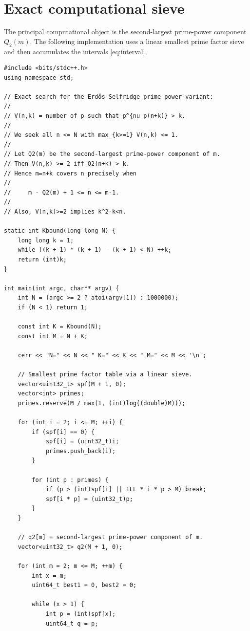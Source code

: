 \documentclass[11pt]{article}
\begin{document}
\appendix

\section{Exact computational sieve}

The principal computational object is the second-largest prime-power
component \(Q_2(m)\).  The following implementation uses a linear smallest
prime factor sieve and then accumulates the intervals \eqref{eq:interval}.

\begin{verbatim}
#include <bits/stdc++.h>
using namespace std;

// Exact search for the Erdős–Selfridge prime-power variant:
//
// V(n,k) = number of p such that p^{nu_p(n+k)} > k.
//
// We seek all n <= N with max_{k>=1} V(n,k) <= 1.
//
// Let Q2(m) be the second-largest prime-power component of m.
// Then V(n,k) >= 2 iff Q2(n+k) > k.
// Hence m=n+k covers n precisely when
//
//     m - Q2(m) + 1 <= n <= m-1.
//
// Also, V(n,k)>=2 implies k^2-k<n.

static int Kbound(long long N) {
    long long k = 1;
    while ((k + 1) * (k + 1) - (k + 1) < N) ++k;
    return (int)k;
}

int main(int argc, char** argv) {
    int N = (argc >= 2 ? atoi(argv[1]) : 1000000);
    if (N < 1) return 1;

    const int K = Kbound(N);
    const int M = N + K;

    cerr << "N=" << N << " K=" << K << " M=" << M << '\n';

    // Smallest prime factor table via a linear sieve.
    vector<uint32_t> spf(M + 1, 0);
    vector<int> primes;
    primes.reserve(M / max(1, (int)log((double)M)));

    for (int i = 2; i <= M; ++i) {
        if (spf[i] == 0) {
            spf[i] = (uint32_t)i;
            primes.push_back(i);
        }

        for (int p : primes) {
            if (p > (int)spf[i] || 1LL * i * p > M) break;
            spf[i * p] = (uint32_t)p;
        }
    }

    // q2[m] = second-largest prime-power component of m.
    vector<uint32_t> q2(M + 1, 0);

    for (int m = 2; m <= M; ++m) {
        int x = m;
        uint64_t best1 = 0, best2 = 0;

        while (x > 1) {
            int p = (int)spf[x];
            uint64_t q = p;


\end{verbatim}
\end{document}
